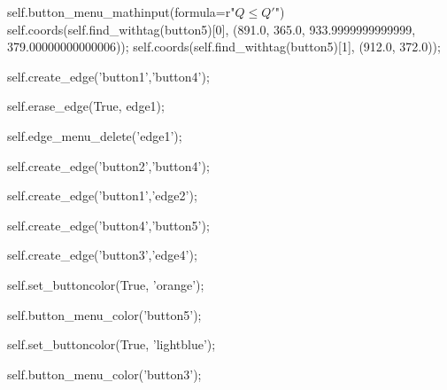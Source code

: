 self.button_menu_mathinput(formula=r"$Q \le Q'$")
self.coords(self.find_withtag(button5)[0], (891.0, 365.0, 933.9999999999999, 379.00000000000006));
self.coords(self.find_withtag(button5)[1], (912.0, 372.0));

self.create_edge('button1','button4');

self.erase_edge(True, edge1);

self.edge_menu_delete('edge1');

self.create_edge('button2','button4');

self.create_edge('button1','edge2');

self.create_edge('button4','button5');

self.create_edge('button3','edge4');

self.set_buttoncolor(True, 'orange');

self.button_menu_color('button5');

self.set_buttoncolor(True, 'lightblue');

self.button_menu_color('button3');

